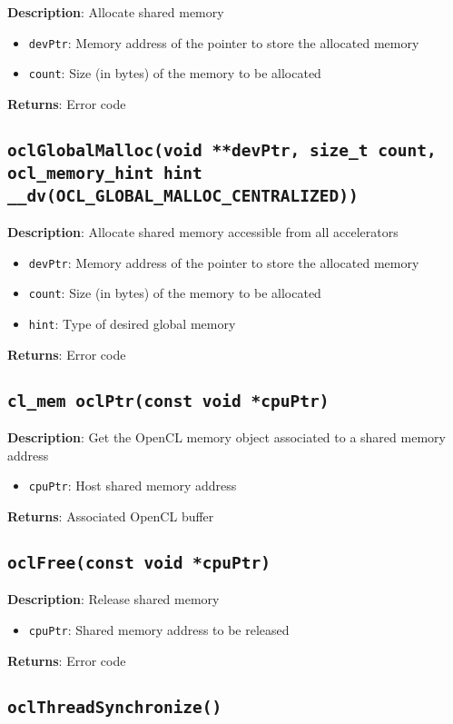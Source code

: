 \textbf{Description}: Allocate shared memory
\begin{itemize}
  \item \texttt{devPtr}: Memory address of the pointer to store the allocated memory
  \item \texttt{count}: Size (in bytes) of the memory to be allocated
\end{itemize}
\textbf{Returns}: Error code

\subsection{\texttt{oclGlobalMalloc(void **devPtr, size\_t count, ocl\_memory\_hint hint \_\_dv(OCL\_GLOBAL\_MALLOC\_CENTRALIZED))}}

\textbf{Description}: Allocate shared memory accessible from all accelerators
\begin{itemize}
  \item \texttt{devPtr}: Memory address of the pointer to store the allocated memory
  \item \texttt{count}: Size (in bytes) of the memory to be allocated
  \item \texttt{hint}: Type of desired global memory
\end{itemize}
\textbf{Returns}: Error code

\subsection{\texttt{cl\_mem oclPtr(const void *cpuPtr)}}

\textbf{Description}: Get the OpenCL memory object associated to a shared memory address
\begin{itemize}
  \item \texttt{cpuPtr}: Host shared memory address
\end{itemize}
\textbf{Returns}: Associated OpenCL buffer

\subsection{\texttt{oclFree(const void *cpuPtr)}}

\textbf{Description}: Release shared memory
\begin{itemize}
  \item \texttt{cpuPtr}: Shared memory address to be released
\end{itemize}
\textbf{Returns}: Error code

\subsection{\texttt{oclThreadSynchronize()}}

